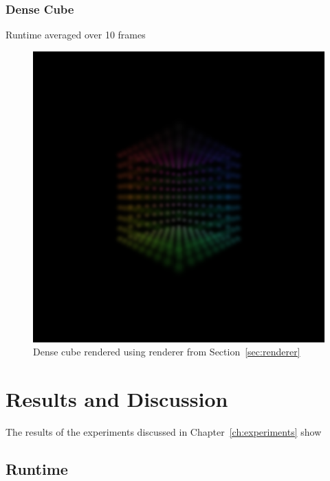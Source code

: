 \documentclass[a4paper, 11pt]{memoir}
\begin{document}
    \subsection{Dense Cube}
    \label{sec:dense_cube}
    Runtime averaged over 10 frames
    \begin{figure}[t]
        \centering
        \includegraphics[scale=.2]{images/cube.png}
        \caption{Dense cube rendered using renderer from Section~\ref{sec:renderer}}
        \label{fig:cube_render}
    \end{figure}
    
    \chapter{Results and Discussion}

    The results of the experiments discussed in Chapter~\ref{ch:experiments} show

    \section{Runtime}
\end{document}
